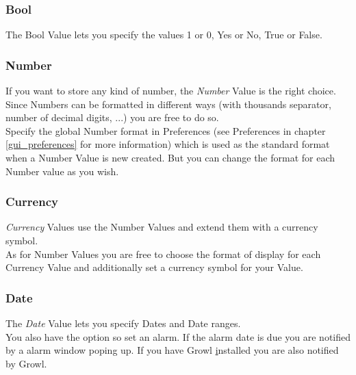 \documentclass[12pt,a4]{article}
\begin{document}
\subsubsection{Bool}
\label{bool_datatype}
\medskip
The Bool Value lets you specify the values 1 or 0, Yes or No, True or False.
\subsubsection{Number}
\label{number_datatype}
\medskip
If you want to store any kind of number, the \textit{Number} Value is the right choice. \\
Since Numbers can be formatted in different ways (with thousands separator, number of decimal digits, ...) you are free to do so. \\
Specify the global Number format in Preferences (see Preferences in chapter \ref{gui_preferences} for more information) which is used as the standard format when a Number Value is new created. But you can change the format for each Number value as you wish.
\subsubsection{Currency}
\label{currency_datatype}
\medskip
\textit{Currency} Values use the Number Values and extend them with a currency symbol. \\
As for Number Values you are free to choose the format of display for each Currency Value and additionally set a currency symbol for your Value.
\subsubsection{Date}
\label{date_datatype}
\medskip
The \textit{Date} Value lets you specify Dates and Date ranges. \\
You also have the option so set an alarm. If the alarm date is due you are notified by a alarm window poping up. If you have Growl \href{http://growl.info/} installed you are also notified by Growl. 
\end{document}

